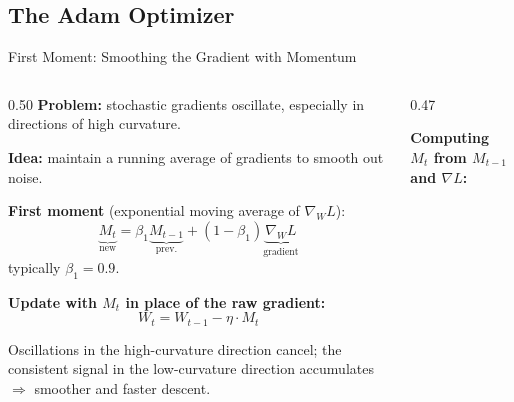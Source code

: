 \subsection{The Adam Optimizer}

\begin{frame}{First Moment: Smoothing the Gradient with Momentum}

  \begin{columns}[T]
    \begin{column}{0.50\textwidth}
      \textbf{Problem:} stochastic gradients oscillate, especially in directions of high curvature.

      \vspace{0.4em}
      \textbf{Idea:} maintain a running average of gradients to smooth out noise.

      \vspace{0.4em}
      \textbf{First moment} (exponential moving average of $\nabla_W L$):
      \[
        \underbrace{M_t}_{\text{new}} = \beta_1 \underbrace{M_{t-1}}_{\text{prev.}} + (1-\beta_1) \underbrace{\nabla_W L}_{\text{gradient}}
      \]
      typically $\beta_1 = 0.9$.

      \vspace{0.4em}
      \textbf{Update with $M_t$ in place of the raw gradient:}
      \[
        W_t = W_{t-1} - \eta \cdot M_t
      \]

      \vspace{0.4em}
      {\small Oscillations in the high-curvature direction cancel; the consistent signal in the low-curvature direction accumulates $\Rightarrow$ smoother and faster descent.}
    \end{column}
    \begin{column}{0.47\textwidth}
      \begin{center}
      \textbf{\small Computing $M_t$ from $M_{t-1}$ and $\nabla L$:}
      \vspace{0.2em}

\end{center}
\end{column}
\end{columns}
\end{frame}
